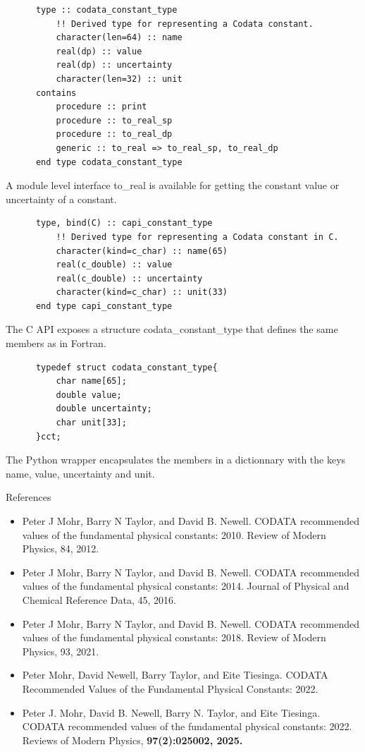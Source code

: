 \begin{verbatim}
      type :: codata_constant_type
          !! Derived type for representing a Codata constant.
          character(len=64) :: name
          real(dp) :: value
          real(dp) :: uncertainty
          character(len=32) :: unit
      contains
          procedure :: print
          procedure :: to_real_sp
          procedure :: to_real_dp
          generic :: to_real => to_real_sp, to_real_dp
      end type codata_constant_type
\end{verbatim}

A module level interface to\_real is available for getting the constant
value or uncertainty of a constant.

\begin{verbatim}
      type, bind(C) :: capi_constant_type
          !! Derived type for representing a Codata constant in C.
          character(kind=c_char) :: name(65)
          real(c_double) :: value
          real(c_double) :: uncertainty
          character(kind=c_char) :: unit(33)
      end type capi_constant_type
\end{verbatim}

The C API exposes a structure codata\_constant\_type that defines the
same members as in Fortran.

\begin{verbatim}
      typedef struct codata_constant_type{
          char name[65];
          double value;
          double uncertainty;
          char unit[33];
      }cct;
\end{verbatim}

The Python wrapper encapsulates the members in a dictionnary with the
keys name, value, uncertainty and unit.

References

\begin{itemize}
\item
  Peter J Mohr, Barry N Taylor, and David B. Newell. CODATA recommended
  values of the fundamental physical constants: 2010. Review of Modern
  Physics, 84, 2012.
\item
  Peter J Mohr, Barry N Taylor, and David B. Newell. CODATA recommended
  values of the fundamental physical constants: 2014. Journal of
  Physical and Chemical Reference Data, 45, 2016.
\item
  Peter J Mohr, Barry N Taylor, and David B. Newell. CODATA recommended
  values of the fundamental physical constants: 2018. Review of Modern
  Physics, 93, 2021.
\item
  Peter Mohr, David Newell, Barry Taylor, and Eite Tiesinga. CODATA
  Recommended Values of the Fundamental Physical Constants: 2022.
\item
  Peter J. Mohr, David B. Newell, Barry N. Taylor, and Eite Tiesinga.
  CODATA recommended values of the fundamental physical constants: 2022.
  Reviews of Modern Physics, \textbf{97(2):025002, 2025.}
\end{itemize}

